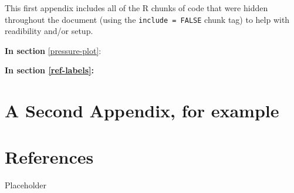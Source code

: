 \documentclass[12pt,oneside]{chicagocapstone}
\begin{document}
This first appendix includes all of the R chunks of code that were
hidden throughout the document (using the \texttt{include\ =\ FALSE}
chunk tag) to help with readibility and/or setup.

\textbf{In section} \ref{pressure-plot}:

\textbf{In section \ref{ref-labels}:}

\chapter{A Second Appendix, for
example}\label{a-second-appendix-for-example}

\chapter*{References}\label{references}

Placeholder


\end{document}
